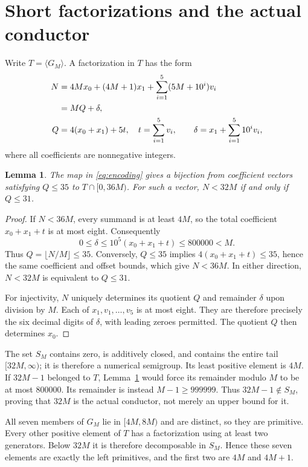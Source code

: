 \documentclass[11pt]{article}
\newtheorem{lemma}[theorem]{Lemma}
\begin{document}
\section{Short factorizations and the actual conductor}
Write $T=\langle G_M\rangle$. A factorization in $T$ has the form
\begin{align}
 N&=4Mx_0+(4M+1)x_1+\sum_{i=1}^5(5M+10^i)v_i\notag\\
  &=M Q+\delta,\label{eq:encoding}\\
 Q&=4(x_0+x_1)+5t,\quad t=\sum_{i=1}^5v_i,
 \qquad \delta=x_1+\sum_{i=1}^5 10^i v_i,\notag
\end{align}
where all coefficients are nonnegative integers.

\begin{lemma}\label{lem:encoding}
The map in \eqref{eq:encoding} gives a bijection from coefficient
vectors satisfying $Q\le35$ to $T\cap[0,36M)$.
For such a vector, $N<32M$ if and only if $Q\le31$.
\end{lemma}
\begin{proof}
If $N<36M$, every summand is at least $4M$, so the total coefficient
$x_0+x_1+t$ is at most eight. Consequently
\[
 0\le\delta\le10^5(x_0+x_1+t)\le800000<M.
\]
Thus $Q=\lfloor N/M\rfloor\le35$.
Conversely, $Q\le35$ implies $4(x_0+x_1+t)\le35$, hence the same
coefficient and offset bounds, which give $N<36M$.
In either direction, $N<32M$ is equivalent to $Q\le31$.

For injectivity, $N$ uniquely determines its quotient $Q$ and remainder
$\delta$ upon division by $M$. Each of $x_1,v_1,\ldots,v_5$ is at most
eight. They are therefore precisely the six decimal digits of $\delta$,
with leading zeroes permitted. The quotient $Q$ then determines $x_0$.
\end{proof}

The set $S_M$ contains zero, is additively closed, and contains the entire
tail $[32M,\infty)$; it is therefore a numerical semigroup.
Its least positive element is $4M$.
If $32M-1$ belonged to $T$, Lemma~\ref{lem:encoding} would force its
remainder modulo $M$ to be at most $800000$. Its remainder is instead
$M-1\ge999999$. Thus $32M-1\notin S_M$, proving that $32M$ is the
actual conductor, not merely an upper bound for it.

All seven members of $G_M$ lie in $[4M,8M)$ and are distinct, so they
are primitive. Every other positive element of $T$ has a factorization
using at least two generators. Below $32M$ it is therefore decomposable
in $S_M$. Hence these seven elements are exactly the left primitives,
and the first two are $4M$ and $4M+1$.
\end{document}
